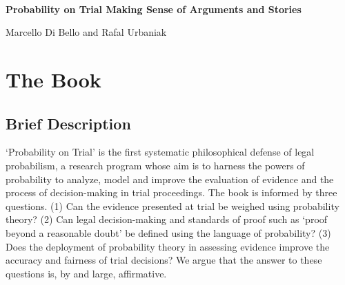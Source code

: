 \documentclass[
  10pt,
  dvipsnames,enabledeprecatedfontcommands]{scrartcl}
\author{}
\date{\vspace{-2.5em}}
\begin{document}
\begin{center}

$\, $

\vspace{-10mm}

\textbf{\huge  Probability on Trial \linebreak \normalsize  Making Sense of Arguments and Stories}
\vspace{1mm}

Marcello Di Bello and Rafal Urbaniak
\end{center}

\vspace{-6mm}

\hypertarget{the-book}{%
\section{The Book}\label{the-book}}

\vspace{-2mm}

\hypertarget{brief-description}{%
\subsection{Brief Description}\label{brief-description}}

\normalsize

`Probability on Trial' is the first systematic philosophical defense of
legal probabilism, a research program whose aim is to harness the powers
of probability to analyze, model and improve the evaluation of evidence
and the process of decision-making in trial proceedings. The book is
informed by three questions. (1) Can the evidence presented at trial be
weighed using probability theory? (2) Can legal decision-making and
standards of proof such as `proof beyond a reasonable doubt' be defined
using the language of probability? (3) Does the deployment of
probability theory in assessing evidence improve the accuracy and
fairness of trial decisions? We argue that the answer to these questions
is, by and large, affirmative.
\end{document}
